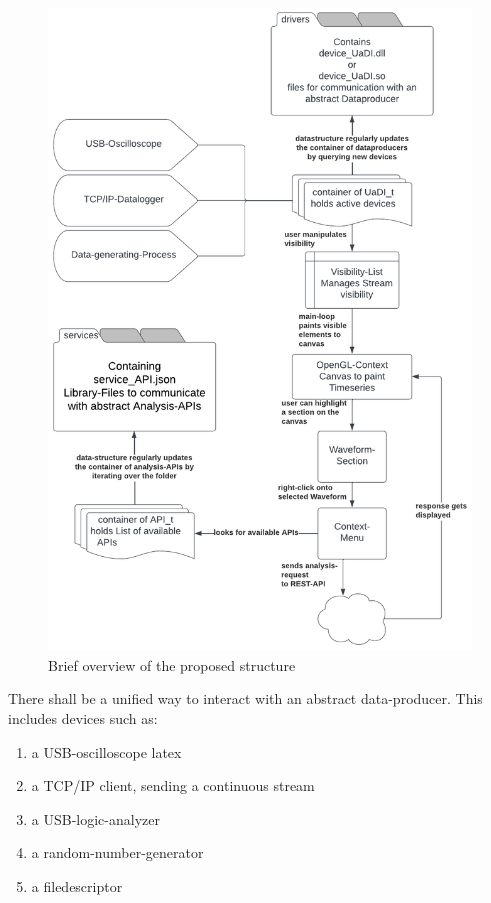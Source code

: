 \documentclass{scrreprt}
\begin{document}
\begin{figure}
    \includegraphics[width=.9\textwidth]{./assets/pictures/overview.pdf}
    \caption[]{Brief overview of the proposed structure}
    \label{fig:overview}
\end{figure}


There shall be a unified way to interact with an abstract data-producer.
This includes devices such as:
\begin{enumerate}
    \item a USB-oscilloscope \gls{latex}
    \item a TCP/IP client, sending a continuous stream
    \item a USB-logic-analyzer
    \item a random-number-generator
    \item a filedescriptor
\end{enumerate}
\end{document}
